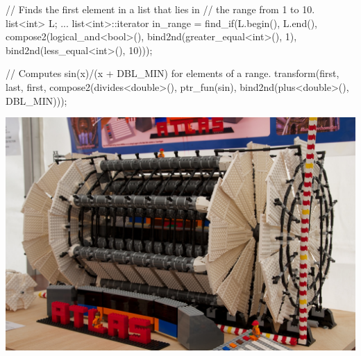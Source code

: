 \begin{frame}[fragile]
  \begin{cppcode}
    // Finds the first element in a list that lies in
    // the range from 1 to 10.
    list<int> L;
    ...
    list<int>::iterator in_range =
      find_if(L.begin(), L.end(),
              compose2(logical_and<bool>(),
                       bind2nd(greater_equal<int>(), 1),
                       bind2nd(less_equal<int>(), 10)));

    // Computes sin(x)/(x + DBL_MIN) for elements of a range.
    transform(first, last, first,
              compose2(divides<double>(),
                       ptr_fun(sin),
                       bind2nd(plus<double>(), DBL_MIN)));
  \end{cppcode}
\end{frame}

\begin{frame}[fragile]
  \begin{block}{}
    \includegraphics[width=\linewidth]{AtlasLego}
  \end{block}
\end{frame}

